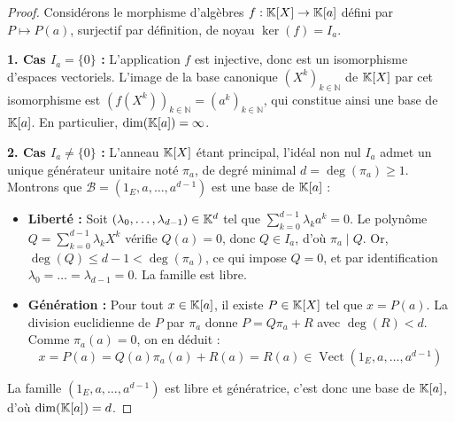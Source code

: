 \documentclass[11pt,a4paper]{report}
\begin{document}
\begin{proof}
    Considérons le morphisme d'algèbres $f : \mathbb{K}[X] \to \mathbb{K}[a]$ défini par $P \mapsto P(a)$, surjectif par définition, de noyau $\ker(f) = I_a$.

    \textbf{1. Cas $I_a = \{0\}$ :}
    L'application $f$ est injective, donc est un isomorphisme d'espaces vectoriels. L'image de la base canonique $(X^k)_{k \in \mathbb{N}}$ de $\mathbb{K}[X]$ par cet isomorphisme est $(f(X^k))_{k \in \mathbb{N}} = (a^k)_{k \in \mathbb{N}}$, qui constitue ainsi une base de $\mathbb{K}[a]$. En particulier, $\dim(\mathbb{K}[a]) = \infty$.

    \textbf{2. Cas $I_a \neq \{0\}$ :}
    L'anneau $\mathbb{K}[X]$ étant principal, l'idéal non nul $I_a$ admet un unique générateur unitaire noté $\pi_a$, de degré minimal $d = \deg(\pi_a) \ge 1$. Montrons que $\mathcal{B} = (1_E, a, \dots, a^{d-1})$ est une base de $\mathbb{K}[a]$ :
    \begin{itemize}
        \item \textbf{Liberté :} Soit $(\lambda_0, \dots, \lambda_{d-1}) \in \mathbb{K}^d$ tel que $\sum_{k=0}^{d-1} \lambda_k a^k = 0$. Le polynôme $Q = \sum_{k=0}^{d-1} \lambda_k X^k$ vérifie $Q(a) = 0$, donc $Q \in I_a$, d'où $\pi_a \mid Q$. Or, $\deg(Q) \le d-1 < \deg(\pi_a)$, ce qui impose $Q = 0$, et par identification $\lambda_0 = \dots = \lambda_{d-1} = 0$. La famille est libre.
        \item \textbf{Génération :} Pour tout $x \in \mathbb{K}[a]$, il existe $P \in \mathbb{K}[X]$ tel que $x = P(a)$. La division euclidienne de $P$ par $\pi_a$ donne $P = Q\pi_a + R$ avec $\deg(R) < d$. Comme $\pi_a(a) = 0$, on en déduit :
        \[
            x = P(a) = Q(a)\pi_a(a) + R(a) = R(a) \in \operatorname{Vect}(1_E, a, \dots, a^{d-1})
        \]
    \end{itemize}
    La famille $(1_E, a, \dots, a^{d-1})$ est libre et génératrice, c'est donc une base de $\mathbb{K}[a]$, d'où $\dim(\mathbb{K}[a]) = d$.
\end{proof}
\end{document}
